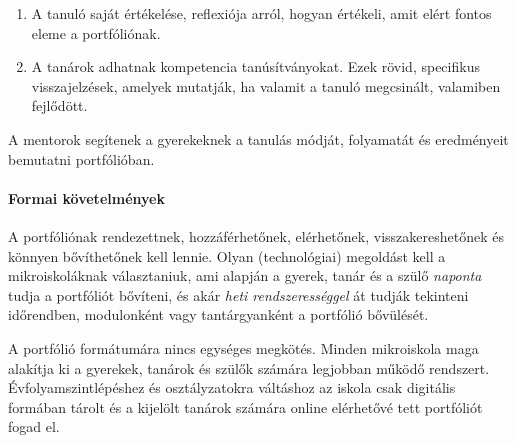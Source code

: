\begin{enumerate}
      \item A tanuló saját értékelése, reflexiója arról, hogyan értékeli, amit
            elért fontos eleme a portfóliónak.

      \item A tanárok adhatnak kompetencia tanúsítványokat. Ezek
            rövid,
            specifikus visszajelzések, amelyek mutatják, ha valamit a tanuló
            megcsinált,
            valamiben fejlődött.
\end{enumerate}

A mentorok segítenek a gyerekeknek a tanulás módját, folyamatát és eredményeit
bemutatni
portfólióban.

\paragraph{Formai követelmények}
A portfóliónak rendezettnek, hozzáférhetőnek,
elérhetőnek, visszakereshetőnek és könnyen bővíthetőnek kell lennie. Olyan
(technológiai)
megoldást kell a mikroiskoláknak választaniuk, ami alapján
a gyerek, tanár és a szülő \emph{naponta} tudja a portfóliót bővíteni, és akár
\emph{heti rendszerességgel} át tudják tekinteni időrendben, modulonként vagy
tantárgyanként a portfólió bővülését.

A portfólió formátumára nincs egységes megkötés. Minden mikroiskola maga
alakítja ki a gyerekek, tanárok és szülők számára legjobban működő rendszert.
Évfolyamszintlépéshez és osztályzatokra váltáshoz az iskola csak digitális
formában tárolt és a kijelölt tanárok számára online elérhetővé tett portfóliót
fogad el.